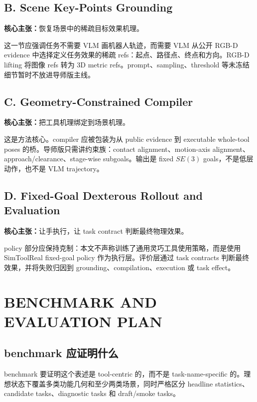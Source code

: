 \documentclass[letterpaper, 10 pt, conference]{ieeeconf}
\newcommand{\claim}[1]{\textbf{核心主张：}#1}
\begin{document}
\subsection{B. Scene Key-Points Grounding}
\claim{恢复场景中的稀疏目标效果机理。}

这一节应强调任务不需要 VLM 画机器人轨迹，而需要 VLM 从公开 RGB-D evidence 中选择定义任务效果的稀疏 refs：起点、路径点、终点和方向。RGB-D lifting 将图像 refs 转为 3D metric refs。prompt、sampling、threshold 等未冻结细节暂时不放进导师版主线。

\subsection{C. Geometry-Constrained Compiler}
\claim{把工具机理绑定到场景机理。}

这是方法核心。compiler 应被包装为从 public evidence 到 executable whole-tool poses 的桥。导师版只需讲约束族：contact alignment、motion-axis alignment、approach/clearance、stage-wise subgoals。输出是 fixed $SE(3)$ goals，不是低层动作，也不是 VLM trajectory。

\subsection{D. Fixed-Goal Dexterous Rollout and Evaluation}
\claim{让手执行，让 task contract 判断最终物理效果。}

policy 部分应保持克制：本文不声称训练了通用灵巧工具使用策略，而是使用 SimToolReal fixed-goal policy 作为执行层。评价层通过 task contracts 判断最终效果，并将失败归因到 grounding、compilation、execution 或 task effect。

\section{BENCHMARK AND EVALUATION PLAN}

\subsection{benchmark 应证明什么}
benchmark 要证明这个表述是 tool-centric 的，而不是 task-name-specific 的。理想状态下覆盖多类功能几何和至少两类场景，同时严格区分 headline statistics、candidate tasks、diagnostic tasks 和 draft/smoke tasks。
\end{document}
